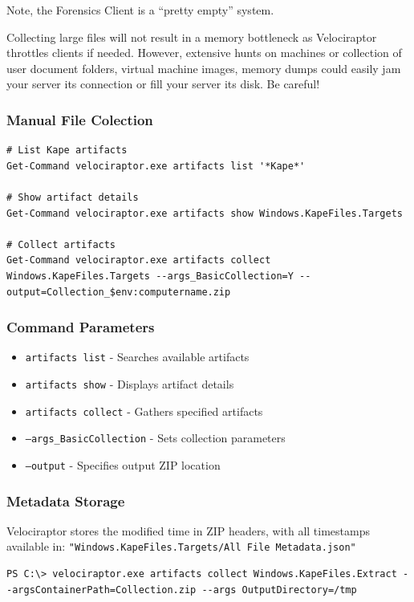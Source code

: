 Note, the Forensics Client is a “pretty empty” system.

Collecting large files will not result in a memory bottleneck as Velociraptor throttles clients if needed. However, extensive hunts on machines or collection of user document folders, virtual machine images, memory dumps could easily jam your server its connection or fill your server its disk. Be careful!

\subsubsection*{Manual File Colection}

\begin{lstlisting}[basicstyle=\ttfamily]
# List Kape artifacts
Get-Command velociraptor.exe artifacts list '*Kape*'

# Show artifact details 
Get-Command velociraptor.exe artifacts show Windows.KapeFiles.Targets

# Collect artifacts
Get-Command velociraptor.exe artifacts collect Windows.KapeFiles.Targets --args_BasicCollection=Y --output=Collection_$env:computername.zip
\end{lstlisting}

\subsubsection*{Command Parameters}
\begin{itemize}
   \item \texttt{artifacts list} - Searches available artifacts
   \item \texttt{artifacts show} - Displays artifact details
   \item \texttt{artifacts collect} - Gathers specified artifacts
   \item \texttt{--args\_BasicCollection} - Sets collection parameters
   \item \texttt{--output} - Specifies output ZIP location
\end{itemize}

\subsubsection*{Metadata Storage}
Velociraptor stores the modified time in ZIP headers, with all timestamps available in:
\texttt{"Windows.KapeFiles.Targets/All File Metadata.json"}

\begin{lstlisting}[basicstyle=\ttfamily]
PS C:\> velociraptor.exe artifacts collect Windows.KapeFiles.Extract --argsContainerPath=Collection.zip --args OutputDirectory=/tmp
\end{lstlisting}


